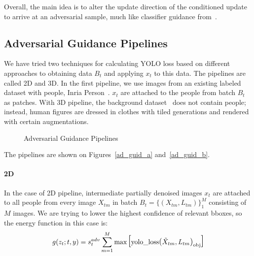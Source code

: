 Overall, the main idea is to alter the update direction of the conditioned update to arrive at an adversarial sample, much like classifier guidance from~\cite{dhariwal2021diffusion}.

\subsection{Adversarial Guidance Pipelines}

We have tried two techniques for calculating YOLO loss based on different approaches to obtaining data $B_t$ and applying $x_t$ to this data.
The pipelines are called 2D and 3D.
In the first pipeline, we use images from an existing labeled dataset with people, Inria Person~\cite{inria}.
$x_t$ are attached to the people from batch $B_t$ as patches.
With 3D pipeline, the background dataset~\cite{zh_3d} does not contain people; instead, human figures are dressed in clothes with tiled generations and rendered with certain augmentations.

\begin{figure}[htp]
\hfill
{}
\caption{Adversarial Guidance Pipelines}
\end{figure}

The pipelines are shown on Figures~\ref{ad_guid_a} and~\ref{ad_guid_b}.


\paragraph{2D} In the case of 2D pipeline, intermediate partially denoised images $x_t$ are attached to all people from every image $X_{tm}$ in batch $B_t = \{(X_{tm}, L_{tm})\}_1^M$ consisting of $M$ images.
We are trying to lower the highest confidence of relevant bboxes, so the energy function in this case is:
$$g(z_t; t, y) = s^{adv}_t \sum_{m=1}^M \max \text{\LARGE [} \text{yolo\_loss}\text{\large (}\Tilde{X}_{tm}, L_{tm}\text{\large )}_{\text{obj}} \text{\LARGE ]}$$

